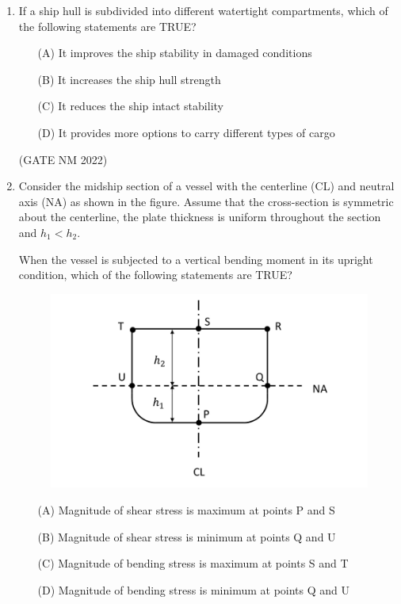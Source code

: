 \documentclass[journal,12pt,onecolumn]{IEEEtran}
\theoremstyle{remark}
\begin{document}
\begin{enumerate}
\item  If a ship hull is subdivided into different watertight compartments, which of the following statements are TRUE?

\begin{enumerate}
    \item[(A)] It improves the ship stability in damaged conditions
    \item[(B)] It increases the ship hull strength
    \item[(C)] It reduces the ship intact stability
    \item[(D)] It provides more options to carry different types of cargo
\end{enumerate}

\hfill(GATE NM 2022)









\item  Consider the midship section of a vessel with the centerline (CL) and neutral axis (NA) as shown in the figure.  
Assume that the cross-section is symmetric about the centerline, the plate thickness is uniform throughout the section and $h_1 < h_2$.  

When the vessel is subjected to a vertical bending moment in its upright condition, which of the following statements are TRUE?

\begin{figure}[h]
	\centering
	\includegraphics[width=0.6\columnwidth]{fig7}
	\caption{}
	\label{fig:placeholder}
\end{figure}

\begin{enumerate}
    \item[(A)] Magnitude of shear stress is maximum at points P and S
    \item[(B)] Magnitude of shear stress is minimum at points Q and U
    \item[(C)] Magnitude of
	    bending stress is maximum at points S and T
    \item[(D)] Magnitude of bending stress is minimum at points Q and U
\end{enumerate}


\end{enumerate}
\end{document}

